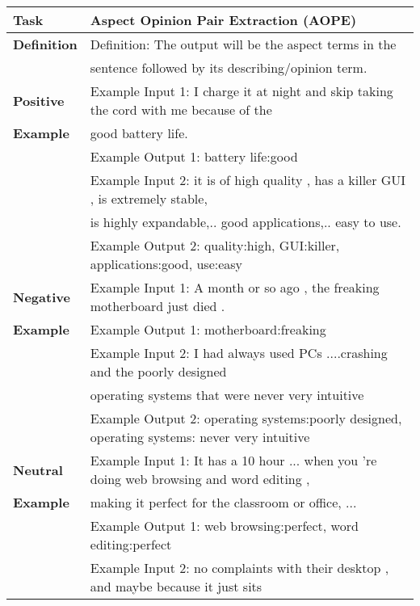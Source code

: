 \documentclass[11pt]{article}
\begin{document}
\begin{table*}[]
\resizebox{\linewidth}{!}
{
\begin{tabular}{ll}
\hline
\textbf{Task} & Aspect Opinion Pair Extraction (AOPE) \\ 
\hline                                                  
\textbf{Definition} & Definition: The output will be the aspect terms in the \\
& sentence followed by its describing/opinion term.\\ 
\hline                                          
\textbf{Positive}   & Example Input 1: I charge it at night and skip taking the cord with me because of the \\ 
\textbf{Example}    &  good battery life.       \\
\textbf{}           & Example Output 1: battery life:good   \\
\textbf{}           & Example Input 2: it is of high quality , has a killer GUI , is extremely stable,\\
\textbf{}           &is highly expandable,.. good applications,.. easy to use.\\
\textbf{}           & Example Output 2: quality:high, GUI:killer, applications:good, use:easy  \\ 
\hline                             
\textbf{Negative}   & Example Input 1: A month or so ago , the freaking motherboard just died . \\
\textbf{Example}    & Example Output 1: motherboard:freaking \\
\textbf{}           & Example Input 2: I had always used PCs ....crashing and the poorly designed \\
\textbf{}           & operating systems that were never very intuitive               \\
\textbf{}           & Example Output 2: operating systems:poorly designed, operating systems: never very intuitive  \\ 
\hline  
\textbf{Neutral}    & Example Input 1: It has a 10 hour ... when you 're doing web browsing and word editing , \\
\textbf{Example}    & making it perfect for the classroom or office, ...          \\
\textbf{}           & Example Output 1: web browsing:perfect, word editing:perfect          \\                            
\textbf{}           & Example Input 2: no complaints with their desktop , and maybe because it just sits \\ 

\end{tabular}}
\end{table*}
\end{document}
